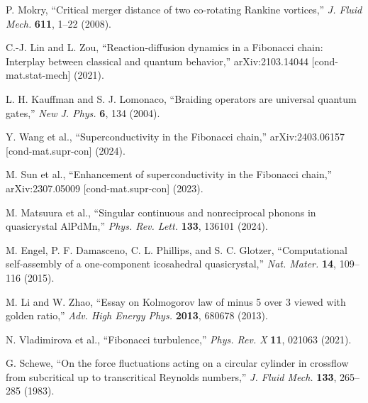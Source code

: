 \begin{thebibliography}{99}
P. Mokry,
``Critical merger distance of two co-rotating Rankine vortices,''
\emph{J. Fluid Mech.} \textbf{611}, 1--22 (2008).

C.-J. Lin and L. Zou,
``Reaction-diffusion dynamics in a Fibonacci chain: Interplay between classical and quantum behavior,''
arXiv:2103.14044 [cond-mat.stat-mech] (2021).

L. H. Kauffman and S. J. Lomonaco,
``Braiding operators are universal quantum gates,''
\emph{New J. Phys.} \textbf{6}, 134 (2004).

Y. Wang et al.,
``Superconductivity in the Fibonacci chain,''
arXiv:2403.06157 [cond-mat.supr-con] (2024).

M. Sun et al.,
``Enhancement of superconductivity in the Fibonacci chain,''
arXiv:2307.05009 [cond-mat.supr-con] (2023).

M. Matsuura et al.,
``Singular continuous and nonreciprocal phonons in quasicrystal AlPdMn,''
\emph{Phys. Rev. Lett.} \textbf{133}, 136101 (2024).

M. Engel, P. F. Damasceno, C. L. Phillips, and S. C. Glotzer,
``Computational self-assembly of a one-component icosahedral quasicrystal,''
\emph{Nat. Mater.} \textbf{14}, 109--116 (2015).

M. Li and W. Zhao,
``Essay on Kolmogorov law of minus 5 over 3 viewed with golden ratio,''
\emph{Adv. High Energy Phys.} \textbf{2013}, 680678 (2013).

N. Vladimirova et al.,
``Fibonacci turbulence,''
\emph{Phys. Rev. X} \textbf{11}, 021063 (2021).

G. Schewe,
``On the force fluctuations acting on a circular cylinder in crossflow from subcritical up to transcritical Reynolds numbers,''
\emph{J. Fluid Mech.} \textbf{133}, 265--285 (1983).

\end{thebibliography}
